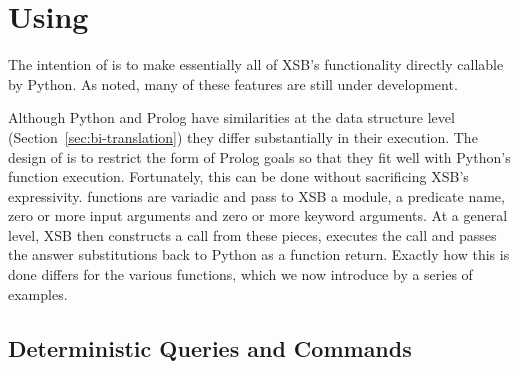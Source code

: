 %
%

\section{Using \px}

The intention of \px{} is to make essentially all of XSB's
functionality directly callable by Python.  As noted, many of these
features are still under development.

Although Python and Prolog have similarities at the data structure
level (Section~\ref{sec:bi-translation}) they differ substantially in
their execution.  The design of \px{} is to restrict the form of
Prolog goals so that they fit well with Python's function execution.
Fortunately, this can be done without sacrificing XSB's expressivity.
\px{} functions are variadic and pass to XSB a module, a predicate
name, zero or more input arguments and zero or more keyword arguments.
At a general level, XSB then constructs a call from these pieces,
executes the call and passes the answer substitutions back to Python
as a function return. Exactly how this is done differs for the various
\px{} functions, which we now introduce by a series of examples.  

\subsection{Deterministic Queries and Commands} \label{sec:pxdet}

